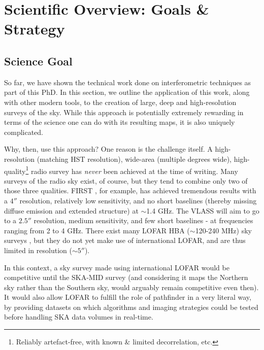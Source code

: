 \chapter{Scientific Overview: Goals \& Strategy}
\minitoc

\section{Science Goal}
\pg
So far, we have shown the technical work done on interferometric techniques as part of this PhD. In this section, we outline the application of this work, along with other modern tools, to the creation of large, deep and high-resolution surveys of the sky. While this approach is potentially extremely rewarding in terms of the science one can do with its resulting maps, it is also uniquely complicated.

\pg
Why, then, use this approach? One reason is the challenge itself. A high-resolution (matching HST resolution), wide-area (multiple degrees wide), high-quality\footnote{Reliably artefact-free, with known \& limited decorrelation, etc.} radio survey has \emph{never} been achieved at the time of writing. Many surveys of the radio sky exist, of course, but they tend to combine only two of those three qualities. FIRST , for example, has achieved tremendous results with a $4''$ resolution, relatively low sensitivity, and no short baselines (thereby missing diffuse emission and extended structure) at $\sim$1.4 GHz. The VLASS  will aim to go to a $2.5''$ resolution, medium sensitivity, and few short baselines - at frequencies ranging from 2 to 4 GHz. There exist many LOFAR HBA ($\sim$120-240 MHz) sky surveys , but they do not yet make use of international LOFAR, and are thus limited in resolution ($\sim 5''$).%

\pg
In this context, a sky survey made using international LOFAR would be competitive until the SKA-MID survey (and considering it maps the Northern sky rather than the Southern sky, would arguably remain competitive even then). It would also allow LOFAR to fulfill the role of pathfinder in a very literal way, by providing datasets on which algorithms and imaging strategies could be tested before handling SKA data volumes in real-time.

